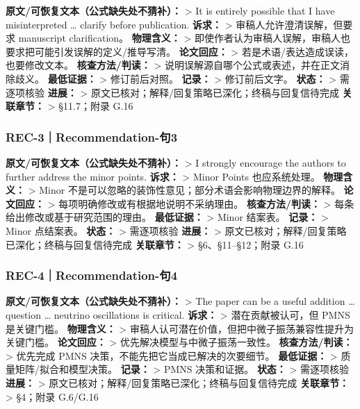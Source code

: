 \documentclass[
]{article}
\begin{document}
\textbf{原文/可恢复文本（公式缺失处不猜补）：} \textgreater{} It is
entirely possible that I have misinterpreted \ldots{} clarify before
publication. \textbf{诉求：} \textgreater{} 审稿人允许澄清误解，但要求
manuscript clarification。 \textbf{物理含义：} \textgreater{}
即使作者认为审稿人误解，审稿人也要求把可能引发误解的定义/推导写清。
\textbf{论文回应：} \textgreater{} 若是术语/表达造成误读，也要修改文本。
\textbf{核查方法/判读：} \textgreater{}
说明误解源自哪个公式或表述，并在正文消除歧义。 \textbf{最低证据：}
\textgreater{} 修订前后对照。 \textbf{记录：} \textgreater{}
修订前后文字。 \textbf{状态：} \textgreater{} 需逐项核验 \textbf{进展：}
\textgreater{} 原文已核对；解释/回复策略已深化；终稿与回复信待完成
\textbf{关联章节：} \textgreater{} §11.7；附录 G.16

\subsubsection{REC-3｜Recommendation-句3}\label{rec-3recommendation-ux53e53}

\textbf{原文/可恢复文本（公式缺失处不猜补）：} \textgreater{} I strongly
encourage the authors to further address the minor points.
\textbf{诉求：} \textgreater{} Minor Points 也应系统处理。
\textbf{物理含义：} \textgreater{} Minor
不是可以忽略的装饰性意见；部分术语会影响物理边界的解释。
\textbf{论文回应：} \textgreater{}
每项明确修改或有根据地说明不采纳理由。 \textbf{核查方法/判读：}
\textgreater{} 每条给出修改或基于研究范围的理由。 \textbf{最低证据：}
\textgreater{} Minor 结案表。 \textbf{记录：} \textgreater{} Minor
点结案表。 \textbf{状态：} \textgreater{} 需逐项核验 \textbf{进展：}
\textgreater{} 原文已核对；解释/回复策略已深化；终稿与回复信待完成
\textbf{关联章节：} \textgreater{} §6、§11--§12；附录 G.16

\subsubsection{REC-4｜Recommendation-句4}\label{rec-4recommendation-ux53e54}

\textbf{原文/可恢复文本（公式缺失处不猜补）：} \textgreater{} The paper
can be a useful addition \ldots{} question \ldots{} neutrino
oscillations is critical. \textbf{诉求：} \textgreater{}
潜在贡献被认可，但 PMNS 是关键门槛。 \textbf{物理含义：} \textgreater{}
审稿人认可潜在价值，但把中微子振荡兼容性提升为关键门槛。
\textbf{论文回应：} \textgreater{} 优先解决模型与中微子振荡一致性。
\textbf{核查方法/判读：} \textgreater{} 优先完成 PMNS
决策，不能先把它当成已解决的次要细节。 \textbf{最低证据：}
\textgreater{} 质量矩阵/拟合和模型决策。 \textbf{记录：} \textgreater{}
PMNS 决策和证据。 \textbf{状态：} \textgreater{} 需逐项核验
\textbf{进展：} \textgreater{}
原文已核对；解释/回复策略已深化；终稿与回复信待完成 \textbf{关联章节：}
\textgreater{} §4；附录 G.6/G.16
\end{document}
